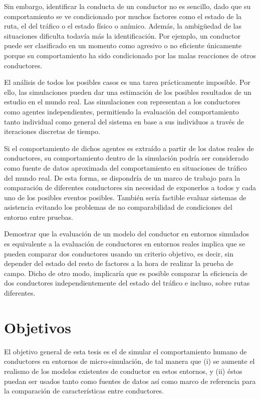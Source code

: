 Sin embargo, identificar la conducta de un conductor no es sencillo, dado que su comportamiento se ve condicionado por muchos factores como el estado de la ruta, el del tráfico o el estado físico o anímico. Además, la ambigüedad de las situaciones dificulta todavía más la identificación. Por ejemplo, un conductor puede ser clasificado en un momento como agresivo o no eficiente únicamente porque su comportamiento ha sido condicionado por las malas reacciones de otros conductores.

El análisis de todos los posibles casos es una tarea prácticamente imposible. Por ello, las simulaciones pueden dar una estimación de los posibles resultados de un estudio en el mundo real. Las simulaciones con  representan a los conductores como agentes independientes, permitiendo la evaluación del comportamiento tanto individual como general del sistema en base a sus individuos a través de iteraciones discretas de tiempo.

Si el comportamiento de dichos agentes es extraído a partir de los datos reales de conductores, su comportamiento dentro de la simulación podría ser considerado como fuente de datos aproximada del comportamiento en situaciones de tráfico del mundo real. De esta forma, se dispondría de un marco de trabajo para la comparación de diferentes conductores sin necesidad de exponerlos a todos y cada uno de los posibles eventos posibles. También sería factible evaluar sistemas de asistencia evitando los problemas de no comparabilidad de condiciones del entorno entre pruebas.

Demostrar que la evaluación de un modelo del conductor en entornos simulados es equivalente a la evaluación de conductores en entornos reales implica que se pueden comparar dos conductores usando un criterio objetivo, es decir, sin depender del estado del resto de factores a la hora de realizar la prueba de campo. Dicho de otro modo, implicaría que es posible comparar la eficiencia de dos conductores independientemente del estado del tráfico e incluso, sobre rutas diferentes.

\section{Objetivos}
\label{ch:intro:objectives}

El objetivo general de esta tesis es el de simular el comportamiento humano de conductores en entornos de micro-simulación, de tal manera que (i) se aumente el realismo de los modelos existentes de conductor en estos entornos, y (ii) éstos puedan ser usados tanto como fuentes de datos así como marco de referencia para la comparación de características entre conductores.


